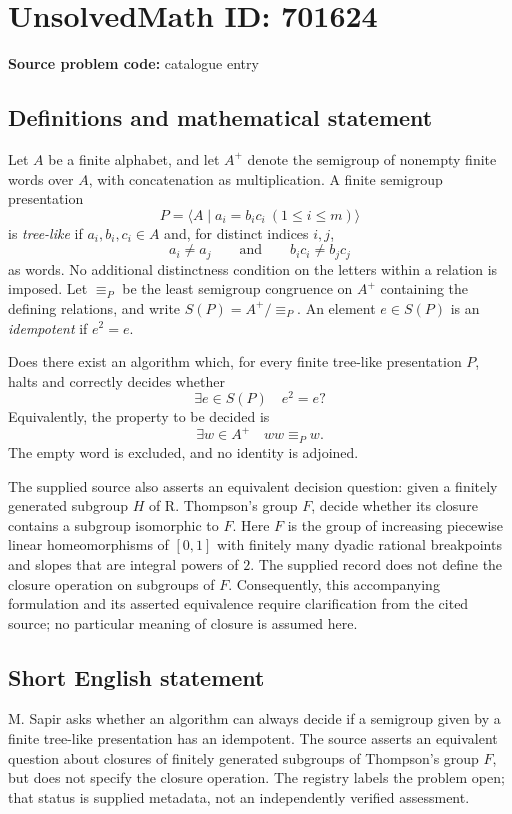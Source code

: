 \documentclass[11pt]{article}
\begin{document}
\section*{UnsolvedMath ID: 701624}
\textbf{Source problem code:} catalogue entry
\subsection{Definitions and mathematical statement}
Let \(A\) be a finite alphabet, and let \(A^+\) denote the semigroup of nonempty finite words over \(A\), with concatenation as multiplication. A finite semigroup presentation
\[
P=\langle A\mid a_i=b_i c_i\ (1\leq i\leq m)\rangle
\]
is \emph{tree-like} if \(a_i,b_i,c_i\in A\) and, for distinct indices \(i,j\),
\[
a_i\neq a_j\qquad\text{and}\qquad b_i c_i\neq b_j c_j
\]
as words. No additional distinctness condition on the letters within a relation is imposed. Let \(\equiv_P\) be the least semigroup congruence on \(A^+\) containing the defining relations, and write \(S(P)=A^+/\!\equiv_P\). An element \(e\in S(P)\) is an \emph{idempotent} if \(e^2=e\).

Does there exist an algorithm which, for every finite tree-like presentation \(P\), halts and correctly decides whether
\[
\exists e\in S(P)\quad e^2=e?
\]
Equivalently, the property to be decided is
\[
\exists w\in A^+\quad ww\equiv_P w.
\]
The empty word is excluded, and no identity is adjoined.

The supplied source also asserts an equivalent decision question: given a finitely generated subgroup \(H\) of R. Thompson's group \(F\), decide whether its closure contains a subgroup isomorphic to \(F\). Here \(F\) is the group of increasing piecewise linear homeomorphisms of \([0,1]\) with finitely many dyadic rational breakpoints and slopes that are integral powers of \(2\). The supplied record does not define the closure operation on subgroups of \(F\). Consequently, this accompanying formulation and its asserted equivalence require clarification from the cited source; no particular meaning of closure is assumed here.
\subsection{Short English statement}
M. Sapir asks whether an algorithm can always decide if a semigroup given by a finite tree-like presentation has an idempotent. The source asserts an equivalent question about closures of finitely generated subgroups of Thompson's group \(F\), but does not specify the closure operation. The registry labels the problem open; that status is supplied metadata, not an independently verified assessment.
\end{document}
